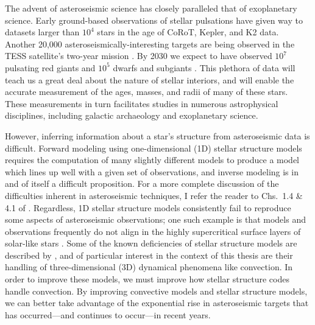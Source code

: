 The advent of asteroseismic science has closely paralleled that of exoplanetary science.
Early ground-based observations of stellar pulsations \cite[e.g.,][]{kjeldsen&frandsen1991, bouchy&carrier2001, bedding&all2001} have given way to datasets larger than $10^4$ stars \cite[e.g.,][]{yu&all2018, santos&all2019b} in the age of CoRoT, Kepler, and K2 data.
Another 20,000 asteroseismically-interesting targets are being observed in the TESS satellite's two-year mission \citep{schofield&all2019}.
By 2030 we expect to have observed $10^7$ pulsating red giants and $10^5$ dwarfs and subgiants \citep{huber&all2019}.
This plethora of data will teach us a great deal about the nature of stellar interiors, and will enable the accurate measurement of the ages, masses, and radii of many of these stars.
These measurements in turn facilitates studies in numerous astrophysical disciplines, including galactic archaeology and exoplanetary science.

However, inferring information about a star's structure from asteroseismic data is difficult.
Forward modeling using one-dimensional (1D) stellar structure models requires the computation of many slightly different models to produce a model which lines up well with a given set of observations, and inverse modeling is in and of itself a difficult proposition.
For a more complete discussion of the difficulties inherent in asteroseismic techniques, I refer the reader to Chs.~1.4 \& 4.1 of \citet{bellingerT2018}.
Regardless, 1D stellar structure models consistently fail to reproduce some aspects of asteroseismic observations; one such example is that models and observations frequently do not align in the highly supercritical surface layers of solar-like stars \citep[as discussed in][]{jorgensen&weiss2019}.
Some of the known deficiencies of stellar structure models are described by \cite{buldgen2019}, and of particular interest in the context of this thesis are their handling of three-dimensional (3D) dynamical phenomena like convection.
In order to improve these models, we must improve how stellar structure codes handle convection.
By improving convective models and stellar structure models, we can better take advantage of the exponential rise in asteroseismic targets that has occurred---and continues to occur---in recent years.



